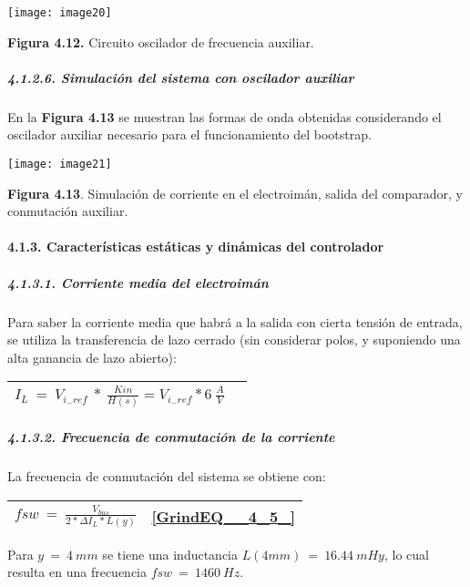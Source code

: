 \documentclass{article} %
\begin{document}
\noindent \texttt{[image: image20]}

\noindent \textbf{Figura 4.12.} Circuito oscilador de frecuencia auxiliar.

\noindent 
\subparagraph{4.1.2.6. Simulaci\'{o}n del sistema con oscilador auxiliar}

\noindent En la \textbf{Figura 4.13} se muestran las formas de onda obtenidas considerando el oscilador auxiliar necesario para el funcionamiento del bootstrap. 

\noindent 

\noindent \texttt{[image: image21]}

\noindent \textbf{Figura 4.13}. Simulaci\'{o}n de corriente en el electroim\'{a}n, salida del comparador, y conmutaci\'{o}n auxiliar.

\noindent 
\paragraph{4.1.3. Caracter\'{i}sticas est\'{a}ticas y din\'{a}micas del controlador}

\noindent 
\subparagraph{4.1.3.1. Corriente media del electroim\'{a}n}

\noindent Para saber la corriente media que habr\'{a} a la salida con cierta tensi\'{o}n de entrada, se utiliza la transferencia de lazo cerrado (sin considerar polos, y suponiendo una alta ganancia de lazo abierto):

\noindent 

\begin{tabular}{|p{3.9in}|p{0.4in}|} \hline 
$I_L\ =\ V_{i_-ref}\ *\ \frac{Kin}{H(s)}=V_{i_-ref}*6\ \frac{A}{V}$ &   \\ \hline 
\end{tabular}


\subparagraph{4.1.3.2. Frecuencia de conmutaci\'{o}n de la corriente}

\noindent La frecuencia de conmutaci\'{o}n del sistema se obtiene con:

\noindent 

\begin{tabular}{|p{3.9in}|p{0.4in}|} \hline 
$fsw\ =\ \frac{V_{bus}}{2*\mathit{\Delta}I_L*L(y)}$\textbf{} & \eqref{GrindEQ__4_5_}  \\ \hline 
\end{tabular}



\noindent Para $y\ =\ 4\ mm$ se tiene una inductancia $L(4mm)\ =\ 16.44\ mHy$, lo cual resulta en una frecuencia $fsw\ =\ 1460\ Hz$.
\end{document}
